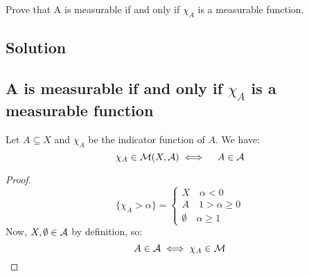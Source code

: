 

\question

Prove that A is measurable if and only if $\chi_A$ is a measurable function.

\subsection*{Solution}

\subsection{A is measurable if and only if \texorpdfstring{$\chi_A$}{the indicator function of A} is a measurable function} \label{AinA:chi}

Let $A\subseteq X$ and $\chi_A$ be the indicator function of $A$. We have:
\[
    \chi_A \in \mathcal{M}(X, \mathcal{A}) \iff \quad A \in \mathcal{A}
\]

\begin{proof}
    \[
        \{ \chi_A > \alpha \}  = \left\{ \begin{array}{l}
            X \quad \alpha <0         \\
            A \quad 1 > \alpha \geq 0 \\
            \emptyset \quad \alpha \geq 1
        \end{array} \right.
    \]
    Now, $X,\emptyset\in\mathcal{A}$ by definition, so:
    \[
        A\in\mathcal{A} \iff \chi_A \in \mathcal{M}
    \]
\end{proof}